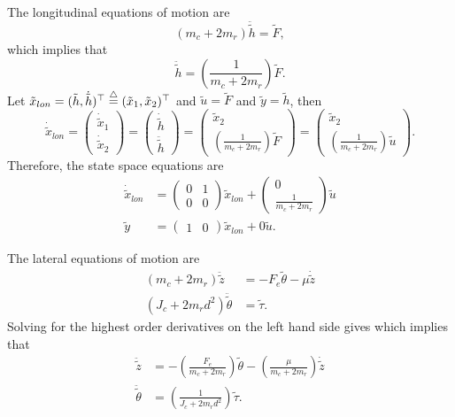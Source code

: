 %

The longitudinal equations of motion are
\[
(m_c+2m_r)\ddot{\tilde{h}} = \tilde{F},
\]
which implies that
\[
\ddot{\tilde{h}} = \left(\frac{1}{m_c+2m_r}\right)\tilde{F}.
\]
Let $\tilde{x}_{lon} = (\tilde{h}, \dot{\tilde{h}})^{\top} \stackrel{\triangle}{=} (\tilde{x}_1, \tilde{x}_2)^{\top}$ and $\tilde{u}=\tilde{F}$ and $\tilde{y}=\tilde{h}$, then
\[
\dot{\tilde{x}}_{lon} = \begin{pmatrix} \dot{\tilde{x}}_1 \\ \dot{\tilde{x}}_2 \end{pmatrix} = \begin{pmatrix} \dot{\tilde{h}} \\ \ddot{\tilde{h}} \end{pmatrix} = \begin{pmatrix} \tilde{x}_2 \\ \left(\frac{1}{m_c+2m_r}\right)\tilde{F} \end{pmatrix} = \begin{pmatrix} \tilde{x}_2 \\ \left(\frac{1}{m_c+2m_r}\right)\tilde{u} \end{pmatrix}.
\]
Therefore, the state space equations are
\begin{align*}
\dot{\tilde{x}}_{lon} &= \begin{pmatrix} 0 & 1 \\ 0 & 0 \end{pmatrix} \tilde{x}_{lon} + \begin{pmatrix} 0 \\ \frac{1}{m_c+2m_r}\end{pmatrix} \tilde{u} \\
\tilde{y} &= \begin{pmatrix} 1 & 0 \end{pmatrix} \tilde{x}_{lon}  + 0 \tilde{u}.
\end{align*}

The lateral equations of motion are
\begin{align*}
(m_c+2m_r)\ddot{\tilde{z}} &= -F_e\tilde{\theta} - \mu\dot{\tilde{z}} \\
(J_c+2m_rd^2)\ddot{\tilde{\theta}} &= \tilde{\tau}.
\end{align*}
Solving for the highest order derivatives on the left hand side gives
which implies that
\begin{align*}
\ddot{\tilde{z}} &= -\left(\frac{F_e}{m_c+2m_r}\right)\tilde{\theta} - \left(\frac{\mu}{m_c+2m_r}\right)\dot{\tilde{z}} \\
\ddot{\tilde{\theta}} &= \left(\frac{1}{J_c+2m_rd^2}\right)\tilde{\tau}.
\end{align*}

